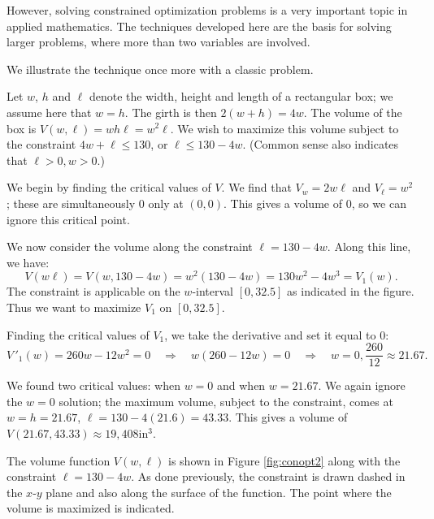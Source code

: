 However, solving constrained optimization problems is a very important topic in applied mathematics. The techniques developed here are the basis for solving larger problems, where more than two variables are involved.

We illustrate the technique once more with a classic problem.\\ 

{Let $w$, $h$ and $\ell$ denote the width, height and length of a rectangular box; we assume here that $w=h$. The girth is then $2(w+h) = 4w$. The volume of the box is $V(w,\ell) = wh\ell = w^2\ell$. We wish to maximize this volume subject to the constraint $4w+\ell\leq 130$, or $\ell\leq 130-4w$. (Common sense also indicates that $\ell>0, w>0$.)

We begin by finding the critical values of $V$. We find that $V_w = 2w\ell$ and $V_\ell = w^2$; these are simultaneously 0 only at $(0,0)$. This gives a volume of 0, so we can ignore this critical point. 

We now consider the volume along the constraint $\ell=130-4w.$ Along this line, we have:
$$V(w\ell) = V(w,130-4w) = w^2(130-4w) = 130w^2-4w^3 = V_1(w).$$
The constraint is applicable on the $w$-interval $[0,32.5]$ as indicated in the figure. Thus we want to maximize $V_1$ on $[0,32.5]$. 

Finding the critical values of $V_1$, we take the derivative and set it equal to 0:
$$V\,'_1(w) = 260w-12w^2 = 0 \quad \Rightarrow \quad w(260-12w)= 0 \quad \Rightarrow \quad w=0,\frac{260}{12}\approx 21.67.$$

We found two critical values: when $w=0$ and when $w=21.67$. We again ignore the $w=0$ solution; the maximum volume, subject to the constraint, comes at $w=h=21.67$, $\ell = 130-4(21.6) =43.33.$ This gives a volume of $V(21.67,43.33) \approx 19,408$in$^3$. 


The volume function $V(w,\ell)$ is shown in Figure \ref{fig:conopt2} along with the constraint $\ell = 130-4w$. As done previously, the constraint is drawn dashed in the $x$-$y$ plane and also along the surface of the function. The point where the volume is maximized is indicated.
}\\

